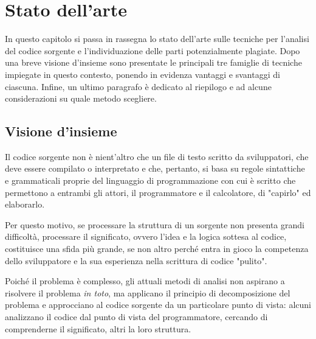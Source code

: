 \chapter{Stato dell'arte}
\label{chapter:stateOfArt}
In questo capitolo si passa in rassegna lo stato dell'arte sulle tecniche per l'analisi del codice sorgente e l'individuazione delle parti potenzialmente plagiate.
%
Dopo una breve visione d'insieme sono presentate le principali tre famiglie di tecniche impiegate in questo contesto, ponendo in evidenza vantaggi e svantaggi di ciascuna.
%
Infine, un ultimo paragrafo è dedicato al riepilogo e ad alcune considerazioni su quale metodo scegliere.

\section{Visione d'insieme}
Il codice sorgente non è nient'altro che un file di testo scritto da sviluppatori, che deve essere compilato o interpretato e che, pertanto, si basa su regole sintattiche e grammaticali proprie del linguaggio di programmazione con cui è scritto che permettono a entrambi gli attori, il programmatore e il calcolatore, di "capirlo" ed elaborarlo.

Per questo motivo, se processare la struttura di un sorgente non presenta grandi difficoltà, processare il significato, ovvero l'idea e la logica sottesa al codice, costituisce una sfida più grande, se non altro perché entra in gioco la competenza dello sviluppatore e la sua esperienza nella scrittura di codice "pulito".

Poiché il problema è complesso, gli attuali metodi di analisi non aspirano a risolvere il problema \textit{in toto}, ma applicano il principio di decomposizione del problema e approcciano al codice sorgente da un particolare punto di vista: alcuni analizzano il codice dal punto di vista del programmatore, cercando di comprenderne il significato, altri la loro struttura.



